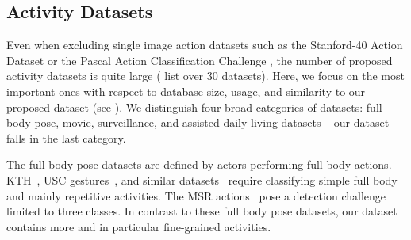 \subsection{Activity Datasets} 
\label{sec:cvpr12:related:datasets}
Even when excluding single image action datasets such as the Stanford-40 Action Dataset \citep{yao11iccv} or the Pascal Action Classification Challenge \citep{everingham11pascal}, the number of proposed activity datasets is quite  large (\citet{ahad11sice} list over 30 datasets). Here, we 
focus on the most important ones with respect to database size, usage, and similarity to our proposed dataset (see ). 
%
We distinguish four broad categories of datasets: full body pose, movie, surveillance, and assisted daily living datasets -- our dataset falls in the last category.

The full body pose datasets are defined by actors performing full body actions. 
KTH~\citep{schuldt04icpr}, USC gestures~\citep{natarajan08cvpr}, and similar datasets~\citep{singh11iccv} require classifying simple full body and mainly repetitive activities. 
 The MSR actions~\citep{yuan09cvpr} pose a detection challenge limited to three classes.
In contrast to these full body pose datasets, our dataset contains more and in particular fine-grained activities. 
 

